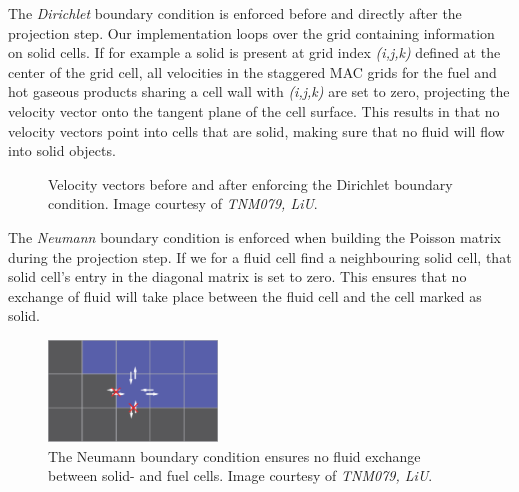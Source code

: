 The \emph{Dirichlet} boundary condition is enforced before and directly after the projection step. Our implementation loops over the grid containing information on solid cells. If for example a solid is present at grid index \emph{(i,j,k)} defined at the center of the grid cell, all velocities in the staggered MAC grids for the fuel and hot gaseous products sharing a cell wall with \emph{(i,j,k)} are set to zero, projecting the velocity vector onto the tangent plane of the cell surface. This results in that no velocity vectors point into cells that are solid, making sure that no fluid will flow into solid objects.

\begin{figure}[H]
\centering
{}
\caption
{
\label{fig:dirichlet_boundary_condition}
Velocity vectors before and after enforcing the Dirichlet boundary condition. Image courtesy of \emph{TNM079, LiU}.
}
\end{figure}

The \emph{Neumann} boundary condition is enforced when building the Poisson matrix during the projection step. If we for a fluid cell find a neighbouring solid cell, that solid cell's entry in the diagonal matrix is set to zero. This ensures that no exchange of fluid will take place between the fluid cell and the cell marked as solid.

\begin{figure}[h!]
\label{fig:neumann_boundary_condition}
\centering
\includegraphics[width=0.4\textwidth]{figures/neumann_condition.png}
\caption{ The Neumann boundary condition ensures no fluid exchange between solid- and fuel cells. Image courtesy of \emph{TNM079, LiU}.}
\end{figure}